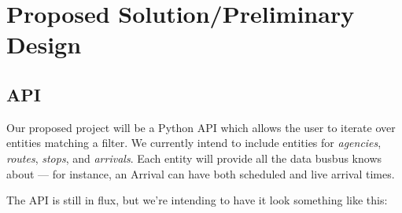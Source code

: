 \documentclass[12pt]{article}
\begin{document}
\section{Proposed Solution/Preliminary Design}
\subsection{API}
Our proposed project will be a Python API which allows the user to iterate over entities matching a filter.
We currently intend to include entities for \textit{agencies}, \textit{routes}, \textit{stops}, and \textit{arrivals}.
Each entity will provide all the data busbus knows about --- for instance, an Arrival can have both scheduled
and live arrival times.

The API is still in flux, but we're intending to have it look something like this:


\end{document}
